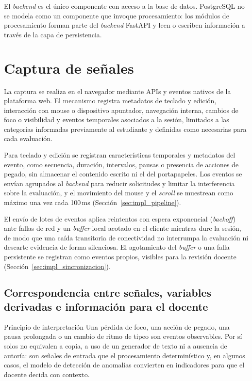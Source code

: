El \textit{backend} es el único componente con acceso a la base de datos. PostgreSQL no se modela como un componente que invoque procesamiento: los módulos de procesamiento forman parte del \textit{backend} FastAPI y leen o escriben información a través de la capa de persistencia.

\section{Captura de señales}

La captura se realiza en el navegador mediante APIs y eventos nativos de la plataforma web. El mecanismo registra metadatos de teclado y edición, interacción con mouse o dispositivo apuntador, navegación interna, cambios de foco o visibilidad y eventos temporales asociados a la sesión, limitados a las categorías informadas previamente al estudiante y definidas como necesarias para cada evaluación.

Para teclado y edición se registran características temporales y metadatos del evento, como secuencia, duración, intervalos, pausas o presencia de acciones de pegado, sin almacenar el contenido escrito ni el del portapapeles. Los eventos se envían agrupados al \textit{backend} para reducir solicitudes y limitar la interferencia sobre la evaluación, y el movimiento del mouse y el \textit{scroll} se muestrean como máximo una vez cada 100\,ms (Sección~\ref{sec:impl_pipeline}).

El envío de lotes de eventos aplica reintentos con espera exponencial (\textit{backoff}) ante fallas de red y un \textit{buffer} local acotado en el cliente mientras dure la sesión, de modo que una caída transitoria de conectividad no interrumpa la evaluación ni descarte evidencia de forma silenciosa. El agotamiento del \textit{buffer} o una falla persistente se registran como eventos propios, visibles para la revisión docente (Sección~\ref{sec:impl_sincronizacion}).

\subsection{Correspondencia entre señales, variables derivadas e información para el docente}
\label{sec:senal_a_insight}

\begin{keyfinding}{Principio de interpretación}
Una pérdida de foco, una acción de pegado, una pausa prolongada o un cambio de ritmo de tipeo son eventos observables. Por sí solos no equivalen a copia, a uso de un generador de texto ni a ausencia de autoría: son señales de entrada que el procesamiento determinístico y, en algunos casos, el modelo de detección de anomalías convierten en indicadores para que el docente decida con contexto.
\end{keyfinding}

